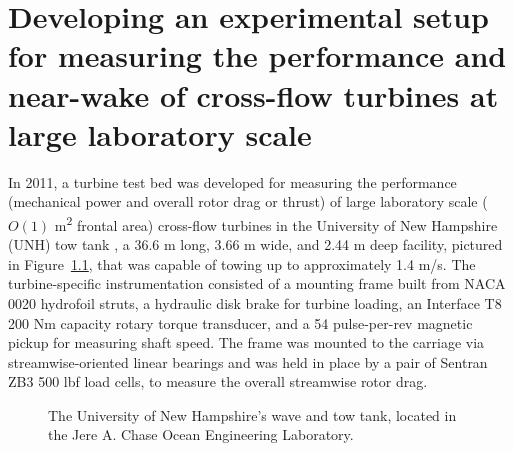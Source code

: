 \chapter{Developing an experimental setup for measuring the performance and
near-wake of cross-flow turbines at large laboratory scale}

In 2011, a turbine test bed was developed for measuring the performance
(mechanical power and overall rotor drag or thrust) of large laboratory scale
($O(1)$ m\textsuperscript{2} frontal area) cross-flow turbines in the University
of New Hampshire (UNH) tow tank \cite{Bachant2011-MS}, a 36.6 m long, 3.66 m
wide, and 2.44 m deep facility, pictured in Figure~\ref{fig:tow-tank}, that was
capable of towing up to approximately 1.4 m/s. The turbine-specific
instrumentation consisted of a mounting frame built from NACA 0020 hydrofoil
struts, a hydraulic disk brake for turbine loading, an Interface T8 200 Nm
capacity rotary torque transducer, and a 54 pulse-per-rev magnetic pickup for
measuring shaft speed. The frame was mounted to the carriage via
streamwise-oriented linear bearings and was held in place by a pair of Sentran
ZB3 500 lbf load cells, to measure the overall streamwise rotor drag.

\begin{figure}
    \caption{The University of New Hampshire's wave and tow tank, located in the
        Jere A. Chase Ocean Engineering Laboratory.}
    
    \label{fig:tow-tank}
\end{figure}

